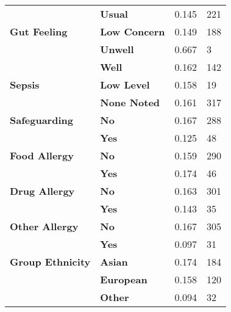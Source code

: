 {\begin{longtable}[c]{P{30mm}P{20mm}P{15mm}P{15mm}}
    & \textbf{Usual} & 0.145 & 221 \\[3mm]
    \textbf{Gut Feeling} & \textbf{Low Concern} & 0.149 & 188 \\*
    & \textbf{Unwell} & 0.667 & 3 \\*
    & \textbf{Well} & 0.162 & 142 \\[3mm]
    \textbf{Sepsis} & \textbf{Low Level} & 0.158 & 19 \\*
    & \textbf{None Noted} & 0.161 & 317 \\[3mm]
    \textbf{Safeguarding} & \textbf{No} & 0.167 & 288 \\*
    & \textbf{Yes} & 0.125 & 48 \\[3mm]
    \textbf{Food Allergy} & \textbf{No} & 0.159 & 290 \\*
    & \textbf{Yes} & 0.174 & 46 \\[3mm]
    \textbf{Drug Allergy} & \textbf{No} & 0.163 & 301 \\*
    & \textbf{Yes} & 0.143 & 35 \\[3mm]
    \textbf{Other Allergy} & \textbf{No} & 0.167 & 305 \\*
    & \textbf{Yes} & 0.097 & 31 \\[3mm]
    \textbf{Group Ethnicity} & \textbf{Asian} & 0.174 & 184 \\*
    & \textbf{European} & 0.158 & 120 \\*
    & \textbf{Other} & 0.094 & 32 \\\toprule
\end{longtable}
}

